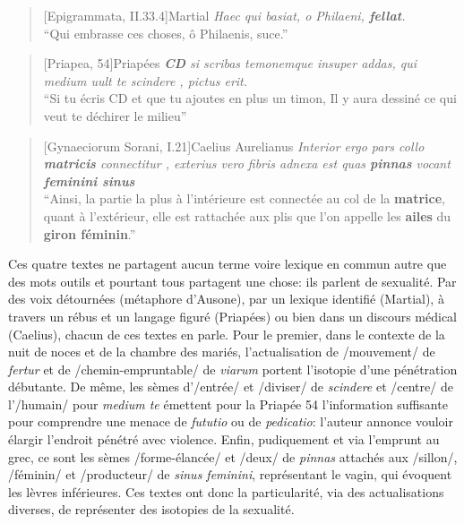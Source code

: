 \begin{quote}[Epigrammata, II.33.4]{Martial}
    \textit{Haec qui basiat, o Philaeni, \textbf{fellat}. \\}
    \enquote{Qui embrasse ces choses, ô Philaenis, suce.}
\end{quote}

\begin{quote}[Priapea, 54]{Priapées}
    \textit{\textbf{CD} si scribas temonemque insuper addas, qui medium uult te scindere , pictus erit.} \\
    \enquote{Si tu écris CD et que tu ajoutes en plus un timon, Il y aura dessiné ce qui veut te déchirer le milieu}
\end{quote}

\begin{quote}[Gynaeciorum Sorani, I.21]{Caelius Aurelianus}
    \textit{Interior ergo pars collo \textbf{matricis} connectitur , exterius vero fibris adnexa est quas \textbf{pinnas} vocant \textbf{feminini sinus}} \\
    \enquote{Ainsi, la partie la plus à l'intérieure est connectée au col de la \textbf{matrice}, quant à l'extérieur, elle est rattachée aux plis que l'on appelle les \textbf{ailes} du \textbf{giron féminin}.}
\end{quote}

Ces quatre textes ne partagent aucun terme voire lexique en commun autre que des mots outils et pourtant tous partagent une chose: ils parlent de sexualité. Par des voix détournées (métaphore d'Ausone), par un lexique identifié (Martial), à travers un rébus et un langage figuré (Priapées) ou bien dans un discours médical (Caelius), chacun de ces textes en parle. Pour le premier, dans le contexte de la nuit de noces et de la chambre des mariés, l'actualisation de /mouvement/ de \textit{fertur} et de /chemin-empruntable/ de \textit{viarum} portent l'isotopie d'une pénétration débutante. De même, les sèmes d'/entrée/ et /diviser/ de \textit{scindere} et /centre/ de l'/humain/ pour \textit{medium te} émettent pour la Priapée 54 l'information suffisante pour comprendre une menace de \textit{fututio} ou de \textit{pedicatio}: l'auteur annonce vouloir élargir l'endroit pénétré avec violence. Enfin, pudiquement et via l'emprunt au grec, ce sont les sèmes /forme-élancée/ et /deux/ de \textit{pinnas} attachés aux /sillon/, /féminin/ et /producteur/ de \textit{sinus feminini}, représentant le vagin, qui évoquent les lèvres inférieures. Ces textes ont donc la particularité, via des actualisations diverses, de représenter des isotopies de la sexualité.


